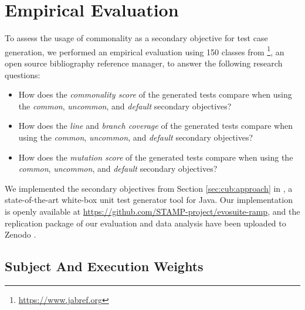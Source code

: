 
\section{Empirical Evaluation}
\label{sec:cub:evaluation}

To assess the usage of commonality as a secondary objective for test case generation, we performed an empirical evaluation using 150 classes from \jabref\footnote{\url{https://www.jabref.org}}, an open source bibliography reference manager, to answer the following research questions:
%
\begin{itemize}
    \item[\textbf{RQ.1}] How does the \emph{commonality score} of the generated tests compare when using the \textit{common}, \textit{uncommon}, and \textit{default} secondary objectives?
    \item[\textbf{RQ.2}] How does the \emph{line} and \emph{branch coverage} of the generated tests  compare when using the \textit{common}, \textit{uncommon}, and \textit{default} secondary objectives?
    \item[\textbf{RQ.3}] How does the \emph{mutation score} of the generated tests  compare when using the \textit{common}, \textit{uncommon}, and \textit{default} secondary objectives? 
\end{itemize}

We implemented the secondary objectives from Section \ref{sec:cub:approach} in \evosuite \cite{Fraser2011}, a state-of-the-art white-box unit test generator tool for Java. Our implementation is openly available at \url{https://github.com/STAMP-project/evosuite-ramp}, and the replication package of our evaluation and data analysis have been uploaded to Zenodo \cite{evers_bjorn_2020_3897513, evers_bjorn_2020_3894711}. 

\subsection{Subject And Execution Weights}

